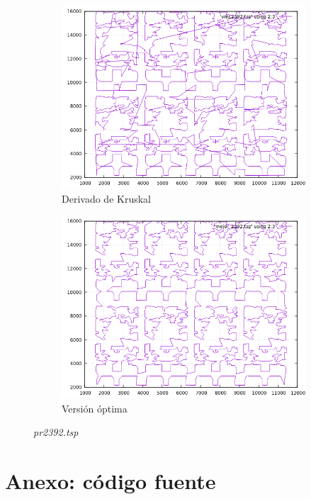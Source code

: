 \documentclass[12pt,spanish]{article}
\begin{document}
\begin{figure}[H]
\begin{subfigure}[b]{0.36\textwidth}
\includegraphics[width=\textwidth]{pr2392_vmc.png}
\caption{Derivado de Kruskal}
\end{subfigure}
\quad
\begin{subfigure}[b]{0.36\textwidth}
\includegraphics[width=\textwidth]{pr2392_mejor.png}
\caption{Versión óptima}
\end{subfigure}
\caption{\textit{pr2392.tsp}}
\end{figure}
\newpage
\section{Anexo: código fuente}
\end{document}
